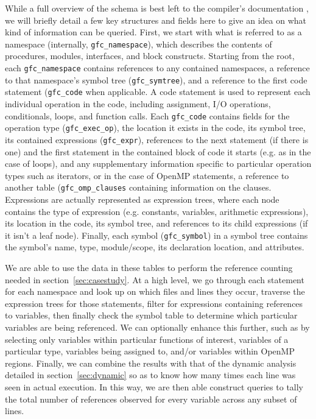 While a full overview of the schema is best left to the compiler's documentation \cite{gcc-docs}, we will briefly detail a few key structures and fields here to give an idea on what kind of information can be queried.
First, we start with what is referred to as a namespace (internally, \texttt{gfc\_namespace}), which describes the contents of procedures, modules, interfaces, and block constructs.
Starting from the root, each \texttt{gfc\_namespace} contains references to any contained namespaces, a reference to that namespace's symbol tree (\texttt{gfc\_symtree}), and a reference to the first code statement (\texttt{gfc\_code} when applicable.
A code statement is used to represent each individual operation in the code, including assignment, \acs{I/O} operations, conditionals, loops, and function calls.
Each \texttt{gfc\_code} contains fields for the operation type (\texttt{gfc\_exec\_op}), the location it exists in the code, its symbol tree, its contained expressions (\texttt{gfc\_expr}), references to the next statement (if there is one) and the first statement in the contained block of code it starts (e.g. as in the case of loops), and any supplementary information specific to particular operation types such as iterators, or in the case of OpenMP statements, a reference to another table (\texttt{gfc\_omp\_clauses} containing information on the clauses.
Expressions are actually represented as expression trees, where each node contains the type of expression (e.g. constants, variables, arithmetic expressions), its location in the code, its symbol tree, and references to its child expressions (if it isn't a leaf node).
Finally, each symbol (\texttt{gfc\_symbol}) in a symbol tree contains the symbol's name, type, module/scope, its declaration location, and attributes.

We are able to use the data in these tables to perform the reference counting needed in section~\ref{sec:casestudy}.
At a high level, we go through each statement for each namespace and look up on which files and lines they occur, traverse the expression trees for those statements, filter for expressions containing references to variables, then finally check the symbol table to determine which particular variables are being referenced.
We can optionally enhance this further, such as by selecting only variables within particular functions of interest, variables of a particular type, variables being assigned to, and/or variables within OpenMP regions.
Finally, we can combine the results with that of the dynamic analysis detailed in section~\ref{sec:dynamic} so as to know how many times each line was seen in actual execution.
In this way, we are then able construct queries to tally the total number of references observed for every variable across any subset of lines.

